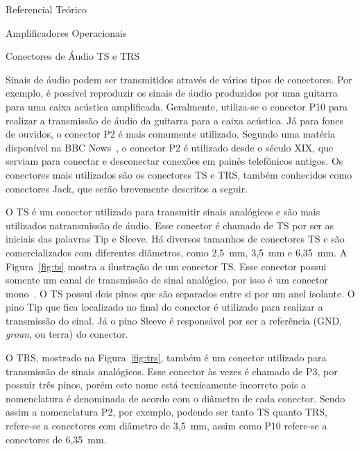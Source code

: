 \begin{chapter}{Referencial Teórico}
\begin{section}{Amplificadores Operacionais}
\end{section}


\begin{section}{Conectores de Áudio TS e TRS}

Sinais de áudio podem ser transmitidos através de vários tipos de conectores.
Por exemplo, é possível reproduzir os sinais de áudio produzidos por uma
guitarra para uma caixa acústica amplificada. Geralmente, utiliza-se o conector
P10 para realizar a transmissão de áudio da guitarra para a caixa acústica. Já
para fones de ouvidos, o conector P2 é mais comumente utilizado. Segundo uma
matéria disponível na BBC News~\cite{BBC}, o conector P2 é utilizado desde o
século XIX, que serviam para conectar e desconectar conexões em painés
telefônicos antigos.  Os conectores mais utilizados são os conectores TS e TRS,
também conhecidos como conectores Jack, que serão brevemente descritos a
seguir.  

O TS é um conector utilizado para transmitir sinais analógicos e são mais
utilizados natransmissão de áudio. Esse conector é chamado de TS por ser as
iniciais das palavras Tip e Sleeve. Há diversos tamanhos de
conectores TS e são comercializados com diferentes diâmetros, como 2,5~mm,
3,5~mm e 6,35~mm. A Figura~\ref{fig:ts} mostra a ilustração de um conector TS.
Esse conector possui somente um canal de transmissão de sinal analógico, por
isso é um conector mono~\cite{ts}. O TS possui dois pinos que são separados
entre si por um anel isolante. O pino Tip que  fica localizado no final do
conector é utilizado para realizar a  transmissão do sinal. Já o pino Sleeve é
responsável por ser a referência (GND, \textit{groun}, ou terra) do conector.


O TRS, mostrado na Figura~\ref{fig:trs}, também é um conector utilizado para
transmissão de sinais analógicos. Esse conector às vezes é chamado de P3, por
possuir três pinos, porém este nome está tecnicamente incorreto pois a
nomenclatura é denominada de acordo com o diâmetro de cada conector. Sendo assim
a nomenclatura P2, por exemplo, podendo ser tanto TS quanto TRS,  refere-se a
conectores com diâmetro de 3,5~mm, assim como P10 refere-se a conectores de
6,35~mm. 



\end{section}
\end{chapter}
